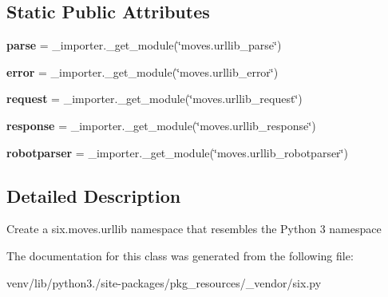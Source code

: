 \subsection*{Static Public Attributes}
\begin{DoxyCompactItemize}
\item 
\mbox{\label{classpkg__resources_1_1__vendor_1_1six_1_1_module__six__moves__urllib_af62cef12af9cad05229a7367c0787667}} 
{\bfseries parse} = \+\_\+importer.\+\_\+get\+\_\+module(\char`\"{}moves.\+urllib\+\_\+parse\char`\"{})
\item 
\mbox{\label{classpkg__resources_1_1__vendor_1_1six_1_1_module__six__moves__urllib_af03029b98a6f926ae9648e2af7f92e8d}} 
{\bfseries error} = \+\_\+importer.\+\_\+get\+\_\+module(\char`\"{}moves.\+urllib\+\_\+error\char`\"{})
\item 
\mbox{\label{classpkg__resources_1_1__vendor_1_1six_1_1_module__six__moves__urllib_ab855260f4f4db280b2ee841745570a9c}} 
{\bfseries request} = \+\_\+importer.\+\_\+get\+\_\+module(\char`\"{}moves.\+urllib\+\_\+request\char`\"{})
\item 
\mbox{\label{classpkg__resources_1_1__vendor_1_1six_1_1_module__six__moves__urllib_a914c3aa07615ed178493ea6f5acef52c}} 
{\bfseries response} = \+\_\+importer.\+\_\+get\+\_\+module(\char`\"{}moves.\+urllib\+\_\+response\char`\"{})
\item 
\mbox{\label{classpkg__resources_1_1__vendor_1_1six_1_1_module__six__moves__urllib_af2b104d7652bf0dded0c006c01b1d896}} 
{\bfseries robotparser} = \+\_\+importer.\+\_\+get\+\_\+module(\char`\"{}moves.\+urllib\+\_\+robotparser\char`\"{})
\end{DoxyCompactItemize}


\subsection{Detailed Description}
\begin{DoxyVerb}Create a six.moves.urllib namespace that resembles the Python 3 namespace\end{DoxyVerb}
 

The documentation for this class was generated from the following file\+:\begin{DoxyCompactItemize}
\item 
venv/lib/python3./site-\/packages/pkg\+\_\+resources/\+\_\+vendor/six.\+py\end{DoxyCompactItemize}
